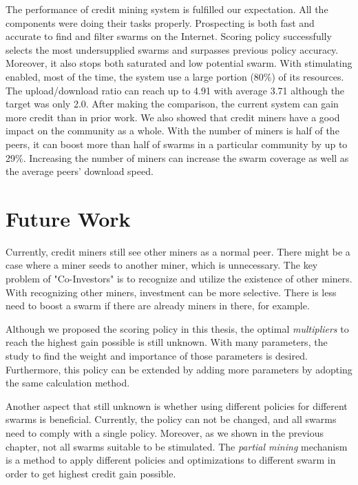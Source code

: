 The performance of credit mining system is fulfilled our expectation. All the components were doing their tasks properly. Prospecting is both fast and accurate to find and filter swarms on the Internet. Scoring policy successfully selects the most undersupplied swarms and surpasses previous policy accuracy. Moreover, it also stops both saturated and low potential swarm. With stimulating enabled, most of the time, the system use a large portion (80\%) of its resources. The upload/download ratio can reach up to 4.91 with average 3.71 although the target was only 2.0. After making the comparison, the current system can gain more credit than in prior work. We also showed that credit miners have a good impact on the community as a whole. With the number of miners is half of the peers, it can boost more than half of swarms in a particular community by up to 29\%. Increasing the number of miners can increase the swarm coverage as well as the average peers' download speed.

\section{Future Work}
Currently, credit miners still see other miners as a normal peer. There might be a case where a miner seeds to another miner, which is unnecessary. The key problem of "Co-Investors" is to recognize and utilize the existence of other miners. With recognizing other miners, investment can be more selective. There is less need to boost a swarm if there are already miners in there, for example. 

Although we proposed the scoring policy in this thesis, the optimal \textit{multipliers} to reach the highest gain possible is still unknown. With many parameters, the study to find the weight and importance of those parameters is desired. Furthermore, this policy can be extended by adding more parameters by adopting the same calculation method.

Another aspect that still unknown is whether using different policies for different swarms is beneficial. Currently, the policy can not be changed, and all swarms need to comply with a single policy. Moreover, as we shown in the previous chapter, not all swarms suitable to be stimulated. The \textit{partial mining} mechanism is a method to apply different policies and optimizations to different swarm in order to get highest credit gain possible. 
